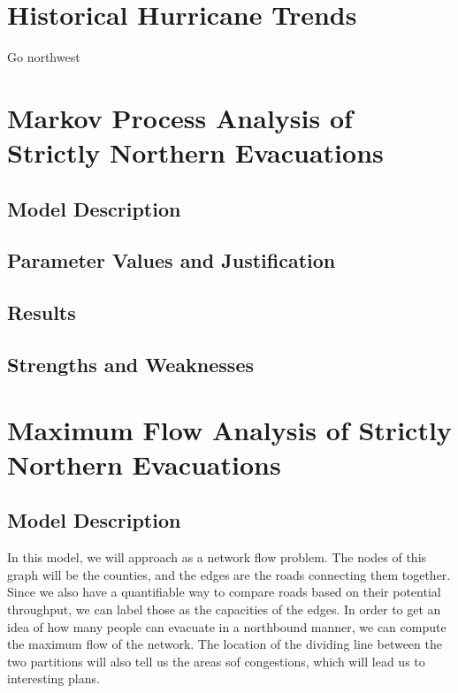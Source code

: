 \documentclass[titlepage]{article}
\begin{document}
\section{Historical Hurricane Trends}
\label{sec:hurricanes}
  Go northwest


\section{Markov Process Analysis of Strictly Northern Evacuations}
\label{sec:markov}
  \subsection{Model Description}
  \subsection{Parameter Values and Justification}
  \subsection{Results}
  \subsection{Strengths and Weaknesses}

\section{Maximum Flow Analysis of Strictly Northern Evacuations}
\label{sec:maxflow}
  \subsection{Model Description}
    \par In this model, we will approach as a network flow problem. The nodes of this graph will be the counties, and the edges are the roads connecting them together. Since we also have a quantifiable way to compare roads based on their potential throughput, we can label those as the capacities of the edges. 
    In order to get an idea of how many people can evacuate in a northbound manner, we can compute the maximum flow of the network. The location of the dividing line between the two partitions will also tell us the areas sof congestions, which will lead us to interesting plans.
\end{document}
